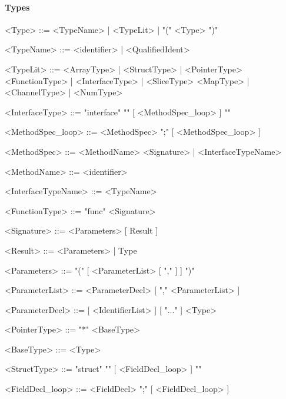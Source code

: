 \documentclass{article}
\begin{document}
    \paragraph{Types}

    \begin{grammar}

        <Type>              ::=     <TypeName> | <TypeLit> | "(" <Type> ")"

        <TypeName>          ::=     <identifier> | <QualifiedIdent>

        <TypeLit>           ::=     <ArrayType> | <StructType> | <PointerType> 
                            \alt    <FunctionType> | <InterfaceType> | <SliceType>
                            \alt    <MapType> | <ChannelType> | <NumType>
        
        <InterfaceType>     ::=     "interface" "{" [ <MethodSpec_loop> ] "}"

        <MethodSpec_loop>   ::=     <MethodSpec> ";" [ <MethodSpec_loop> ]

        <MethodSpec>        ::=     <MethodName> <Signature> | <InterfaceTypeName>

        <MethodName>        ::=     <identifier>

        <InterfaceTypeName> ::=     <TypeName>

        <FunctionType>      ::=     "func" <Signature>

        <Signature>         ::=     <Parameters> [ Result ]

        <Result>            ::=     <Parameters> | Type

        <Parameters>        ::=     "(" [ <ParameterList> [ "," ] ] ")"

        <ParameterList>     ::=     <ParameterDecl> [ "," <ParameterList> ]
        
        <ParameterDecl>     ::=     [ <IdentifierList> ] [ "..." ] <Type>

        <PointerType>       ::=     "*" <BaseType>

        <BaseType>          ::=     <Type>

        <StructType>        ::=     "struct" "{" [ <FieldDecl_loop> ] "}"

        <FieldDecl_loop>    ::=     <FieldDecl> ";" [ <FieldDecl_loop> ]


\end{grammar}
\end{document}
